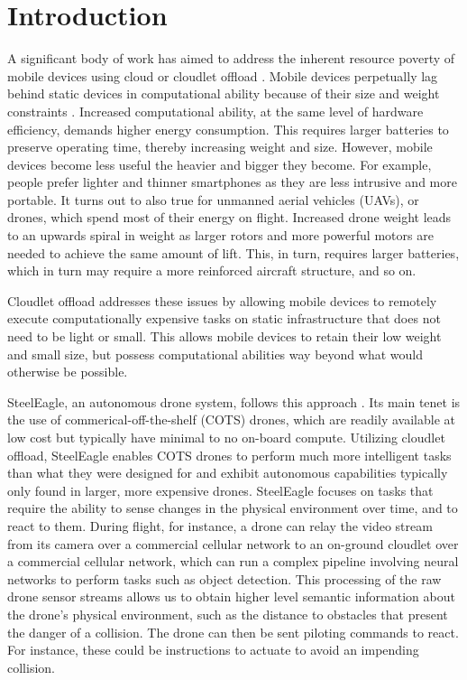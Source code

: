 \chapter{Introduction}
A significant body of work has aimed to address the inherent resource poverty
of mobile devices using cloud or cloudlet offload \cite{satya}. Mobile
devices perpetually lag behind static devices in computational ability because
of their size and weight constraints \cite{satya2014}. Increased computational
ability, at the same level of hardware efficiency, demands higher energy
consumption. This requires larger batteries to preserve operating time, thereby
increasing weight and size.  However, mobile devices become less useful the
heavier and bigger they become.  For example, people prefer lighter and thinner
smartphones as they are less intrusive and more portable. It turns out to also
true for unmanned aerial vehicles (UAVs), or drones, which spend most of their
energy on flight.  Increased drone weight leads to an upwards spiral in weight
as larger rotors and more powerful motors are needed to achieve the same amount
of lift.  This, in turn, requires larger batteries, which in turn may require a
more reinforced aircraft structure, and so on.

Cloudlet offload addresses these issues by allowing mobile devices to remotely
execute computationally expensive tasks on static infrastructure that does not
need to be light or small. This allows mobile devices to retain their low
weight and small size, but possess computational abilities way beyond what
would otherwise be possible.

SteelEagle, an autonomous drone system, follows this approach \cite{bala2024}.
Its main tenet is the use of commerical-off-the-shelf (COTS) drones, which are
readily available at low cost but typically have minimal to no on-board
compute.  Utilizing cloudlet offload, SteelEagle enables COTS drones to perform
much more intelligent tasks than what they were designed for and exhibit
autonomous capabilities typically only found in larger, more expensive drones.
SteelEagle focuses on tasks that require the ability to sense changes in the
physical environment over time, and to react to them. During flight, for
instance, a drone can relay the video stream from its camera over a commercial
cellular network to an on-ground cloudlet over a commercial cellular network,
which can run a complex pipeline involving neural networks to perform tasks
such as object detection.  This processing of the raw drone sensor streams
allows us to obtain higher level semantic information about the drone's
physical environment, such as the distance to obstacles that present the danger
of a collision. The drone can then be sent piloting commands to react. For
instance, these could be instructions to actuate to avoid an impending
collision.


